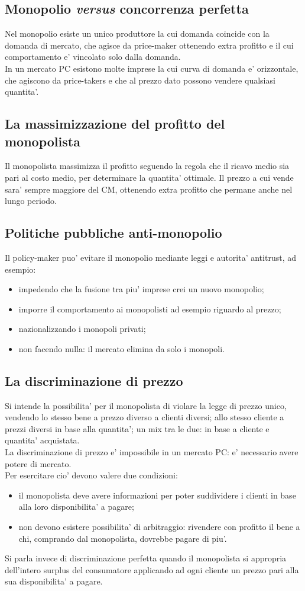 \documentclass{report}
\begin{document}
	\subsection{Monopolio \textit{versus} concorrenza perfetta}
	Nel monopolio esiste un unico produttore la cui domanda coincide con la domanda di mercato, che agisce da price-maker ottenendo extra profitto e il cui comportamento e' vincolato solo dalla domanda.
	\medskip \\In un mercato PC esistono molte imprese la cui curva di domanda e' orizzontale, che agiscono da price-takers e che al prezzo dato possono vendere qualsiasi quantita'.
	\subsection{La massimizzazione del profitto del monopolista}
	Il monopolista massimizza il profitto seguendo la regola che il ricavo medio sia pari al costo medio, per determinare la quantita' ottimale. Il prezzo a cui vende sara' sempre maggiore del CM, ottenendo extra profitto che permane anche nel lungo periodo.
	\subsection{Politiche pubbliche anti-monopolio}
	Il policy-maker puo' evitare il monopolio mediante leggi e autorita' antitrust, ad esempio:
	\begin{itemize}
		\item impedendo che la fusione tra piu' imprese crei un nuovo monopolio; \item imporre il comportamento ai monopolisti ad esempio riguardo al prezzo; \item nazionalizzando i monopoli privati; \item non facendo nulla: il mercato elimina da solo i monopoli.
	\end{itemize}
	\subsection{La discriminazione di prezzo}
	Si intende la possibilita' per il monopolista di violare la legge di prezzo unico, vendendo lo stesso bene a prezzo diverso a clienti diversi; allo stesso cliente a prezzi diversi in base alla quantita'; un mix tra le due: in base a cliente e quantita' acquistata.
	\medskip \\
	La discriminazione di prezzo e' impossibile in un mercato PC: e' necessario avere potere di mercato.
	\medskip \\
	Per esercitare cio' devono valere due condizioni:
	\begin{itemize}
		\item il monopolista deve avere informazioni per poter suddividere i clienti in base alla loro disponibilita' a pagare;
		\item non devono esistere possibilita' di arbitraggio: rivendere con profitto il bene a chi, comprando dal monopolista, dovrebbe pagare di piu'.
	\end{itemize}
	Si parla invece di discriminazione perfetta quando il monopolista si appropria dell'intero surplus del consumatore applicando ad ogni cliente un prezzo pari alla sua disponibilita' a pagare.
\end{document}

